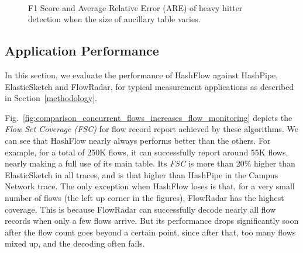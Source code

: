 \begin{figure}[ht!]
	\centering
	\mbox{
	}
	\caption{F1 Score and Average Relative Error (ARE) of heavy hitter detection when the size of ancillary table varies.}
	\label{fig:are_for_various_beta}
\end{figure}




\subsection{Application Performance }
In this section, we evaluate the performance of HashFlow against HashPipe, ElasticSketch and FlowRadar, 
for typical measurement applications as described in  Section~\ref{methodology}.

Fig.~\ref{fig:comparison_concurrent_flows_increases_flow_monitoring} depicts the 
\emph{Flow Set Coverage (FSC)} for flow record report achieved by these algorithms.
We can see that HashFlow nearly always performs better than the others. For example, 
for a total of 250K flows, it can successfully report around 55K flows, 
nearly making a full use of its main table. 
Its \emph{FSC} is more than 20\% higher than ElasticSketch in all traces, 
and is that higher than HashPipe in the Campus Network trace. 
The only exception when HashFlow loses is that, 
for a very small number of flows (the left up corner in the figures), 
FlowRadar has the highest coverage. 
This is because FlowRadar can successfully decode nearly all flow records when only a few flows arrive. 
But its performance drops significantly soon after the flow count goes beyond a certain point, 
since after that, too many flows mixed up, and the decoding often fails.


